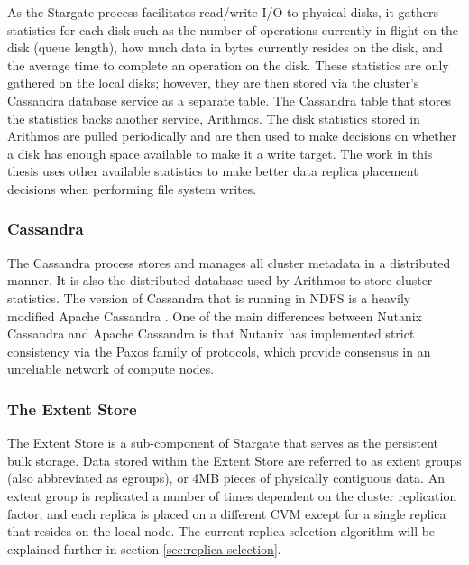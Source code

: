 \documentclass[12pt]{article}
\begin{document}
    As the Stargate process facilitates read/write I/O to physical disks, it
    gathers statistics for each disk such as the number of operations currently
    in flight on the disk (queue length), how much data in bytes currently
    resides on the disk, and the average time to complete an operation on the
    disk. These statistics are only gathered on the local disks; however, they
    are then stored via the cluster's Cassandra database service as a separate
    table. The Cassandra table that stores the statistics backs another
    service, Arithmos. The disk statistics stored in Arithmos are pulled
    periodically and are then used to make decisions on whether a disk has
    enough space available to make it a write target. The work in this thesis
    uses other available statistics to make better data replica placement
    decisions when performing file system writes.

    \subsubsection{Cassandra}

    The Cassandra process stores and manages all cluster metadata in a
    distributed manner. It is also the distributed database used by Arithmos to
    store cluster statistics. The version of Cassandra that is running in NDFS
    is a heavily modified Apache Cassandra \cite{cassandra}. One of the main
    differences between Nutanix Cassandra and Apache Cassandra is that Nutanix
    has implemented strict consistency via the Paxos \cite{paxos2005} family of
    protocols, which provide consensus in an unreliable network of compute
    nodes.

    \subsubsection{The Extent Store}

    The Extent Store is a sub-component of Stargate that serves as the
    persistent bulk storage. Data stored within the Extent Store are referred
    to as extent groups (also abbreviated as egroups), or 4MB pieces of
    physically contiguous data. An extent group is replicated a number of
    times dependent on the cluster replication factor, and each replica is
    placed on a different CVM except for a single replica that resides on the
    local node. The current replica selection algorithm will be explained
    further in section \ref{sec:replica-selection}.
\end{document}
